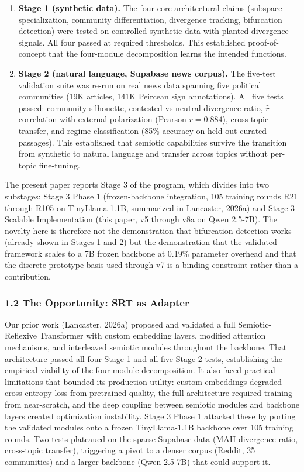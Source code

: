 \documentclass[
  11pt]{article}
\providecommand{\tightlist}{%
  \setlength{\itemsep}{0pt}\setlength{\parskip}{0pt}}
\begin{document}
\begin{enumerate}
\def\labelenumi{\arabic{enumi}.}
\tightlist
\item
  \textbf{Stage 1 (synthetic data).} The four core architectural claims
  (subspace specialization, community differentiation, divergence
  tracking, bifurcation detection) were tested on controlled synthetic
  data with planted divergence signals. All four passed at required
  thresholds. This established proof-of-concept that the four-module
  decomposition learns the intended functions.
\item
  \textbf{Stage 2 (natural language, Supabase news corpus).} The
  five-test validation suite was re-run on real news data spanning five
  political communities (19K articles, 141K Peircean sign annotations).
  All five tests passed: community silhouette, contested-vs-neutral
  divergence ratio, \(\hat{r}\) correlation with external polarization
  (Pearson \(r = 0.884\)), cross-topic transfer, and regime
  classification (85\% accuracy on held-out curated passages). This
  established that semiotic capabilities survive the transition from
  synthetic to natural language and transfer across topics without
  per-topic fine-tuning.
\end{enumerate}

The present paper reports Stage 3 of the program, which divides into two
substages: Stage 3 Phase 1 (frozen-backbone integration, 105 training
rounds R21 through R105 on TinyLlama-1.1B, summarized in Lancaster,
2026a) and Stage 3 Scalable Implementation (this paper, v5 through v8a
on Qwen 2.5-7B). The novelty here is therefore not the demonstration
that bifurcation detection works (already shown in Stages 1 and 2) but
the demonstration that the validated framework scales to a 7B frozen
backbone at 0.19\% parameter overhead and that the discrete prototype
basis used through v7 is a binding constraint rather than a
contribution.

\subsubsection{1.2 The Opportunity: SRT as
Adapter}\label{the-opportunity-srt-as-adapter}

Our prior work (Lancaster, 2026a) proposed and validated a full
Semiotic-Reflexive Transformer with custom embedding layers, modified
attention mechanisms, and interleaved semiotic modules throughout the
backbone. That architecture passed all four Stage 1 and all five Stage 2
tests, establishing the empirical viability of the four-module
decomposition. It also faced practical limitations that bounded its
production utility: custom embeddings degraded cross-entropy loss from
pretrained quality, the full architecture required training from
near-scratch, and the deep coupling between semiotic modules and
backbone layers created optimization instability. Stage 3 Phase 1
attacked these by porting the validated modules onto a frozen
TinyLlama-1.1B backbone over 105 training rounds. Two tests plateaued on
the sparse Supabase data (MAH divergence ratio, cross-topic transfer),
triggering a pivot to a denser corpus (Reddit, 35 communities) and a
larger backbone (Qwen 2.5-7B) that could support it.
\end{document}
